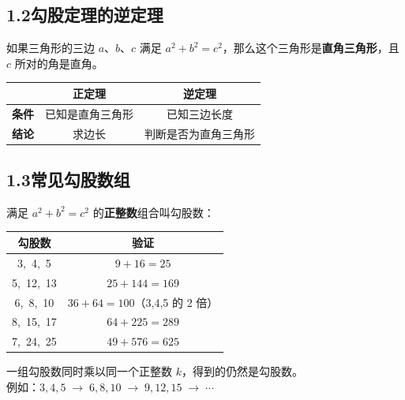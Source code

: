 \documentclass[12pt, a4paper]{ctexart}
\begin{document}
\subsection*{1.2\quad 勾股定理的逆定理}

\begin{knowledgebox}[逆定理]
如果三角形的三边 $a$、$b$、$c$ 满足 $a^2 + b^2 = c^2$，那么这个三角形是\textbf{直角三角形}，且 $c$ 所对的角是直角。
\end{knowledgebox}

\vspace{4pt}

\begin{center}
\renewcommand{\arraystretch}{1.4}
\begin{tabular}{|c|c|c|}
\hline
 & \textbf{正定理} & \textbf{逆定理} \\
\hline
\textbf{条件} & 已知是直角三角形 & 已知三边长度 \\
\hline
\textbf{结论} & 求边长 & 判断是否为直角三角形 \\
\hline
\end{tabular}
\end{center}

\subsection*{1.3\quad 常见勾股数组}

满足 $a^2+b^2=c^2$ 的\textbf{正整数}组合叫勾股数：

\begin{center}
\renewcommand{\arraystretch}{1.3}
\begin{tabular}{|c|c|}
\hline
\textbf{勾股数} & \textbf{验证} \\
\hline
3,\ 4,\ 5 & $9+16=25$ \\
\hline
5,\ 12,\ 13 & $25+144=169$ \\
\hline
6,\ 8,\ 10 & $36+64=100$\quad（3,4,5 的 2 倍） \\
\hline
8,\ 15,\ 17 & $64+225=289$ \\
\hline
7,\ 24,\ 25 & $49+576=625$ \\
\hline
\end{tabular}
\end{center}

\begin{tipbox}[规律]
一组勾股数同时乘以同一个正整数 $k$，得到的仍然是勾股数。\\
例如：$3,4,5 \;\to\; 6,8,10 \;\to\; 9,12,15 \;\to\; \cdots$
\end{tipbox}
\end{document}
